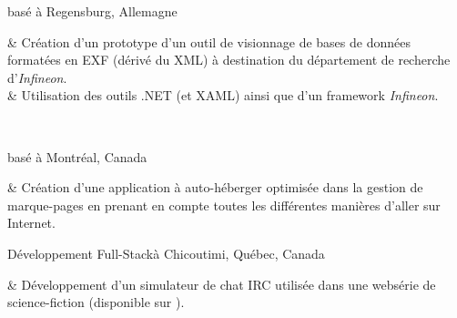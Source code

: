 	{ basé à Regensburg, Allemagne}

\begin{cvstate}
	\begin{cvtable}{2.5ex}
		{\tiny {}} & Création d'un prototype d'un outil de visionnage de bases de données formatées en EXF (dérivé du XML) à destination du département de recherche d'\textit{Infineon}.\\
		{\tiny {}} & Utilisation des outils .NET (\csharp et XAML) ainsi que d'un framework \textit{Infineon}.\\
	\end{cvtable}

	\\
\end{cvstate}


	{ basé à Montréal, Canada}

\begin{cvstate}
	\begin{cvtable}{2.5ex}
		{\tiny {}} & Création d'une application à auto-héberger optimisée dans la gestion de marque-pages en prenant en compte toutes les différentes manières d'aller sur Internet.
	\end{cvtable}

\end{cvstate}

	{}{Développement Full-Stack}{}{}{à Chicoutimi, Québec, Canada}

\begin{cvstate}
	\begin{cvtable}{2.5ex}
		{\tiny {}} & Développement d'un simulateur de chat IRC utilisée dans une websérie de science-fiction (disponible sur ).
	\end{cvtable}

\end{cvstate}
